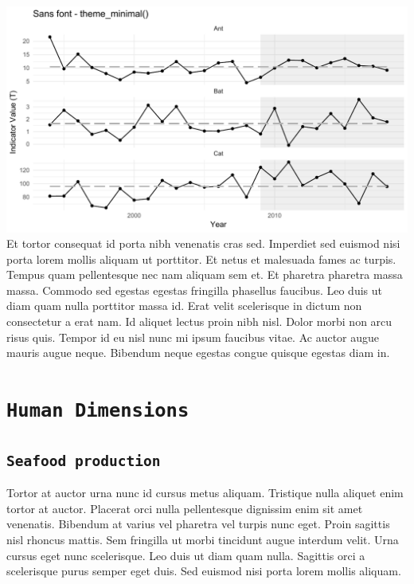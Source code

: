 \documentclass[11pt,]{article}
\begin{document}
\includegraphics{font_test_files/figure-latex/unnamed-chunk-1-1.pdf} Et
tortor consequat id porta nibh venenatis cras sed. Imperdiet sed euismod
nisi porta lorem mollis aliquam ut porttitor. Et netus et malesuada
fames ac turpis. Tempus quam pellentesque nec nam aliquam sem et. Et
pharetra pharetra massa massa. Commodo sed egestas egestas fringilla
phasellus faucibus. Leo duis ut diam quam nulla porttitor massa id. Erat
velit scelerisque in dictum non consectetur a erat nam. Id aliquet
lectus proin nibh nisl. Dolor morbi non arcu risus quis. Tempor id eu
nisl nunc mi ipsum faucibus vitae. Ac auctor augue mauris augue neque.
Bibendum neque egestas congue quisque egestas diam in.

\section{\texorpdfstring{\texttt{Human\ Dimensions}}{Human Dimensions}}\label{human-dimensions}

\subsection{\texorpdfstring{\texttt{Seafood\ production}}{Seafood production}}\label{seafood-production}

Tortor at auctor urna nunc id cursus metus aliquam. Tristique nulla
aliquet enim tortor at auctor. Placerat orci nulla pellentesque
dignissim enim sit amet venenatis. Bibendum at varius vel pharetra vel
turpis nunc eget. Proin sagittis nisl rhoncus mattis. Sem fringilla ut
morbi tincidunt augue interdum velit. Urna cursus eget nunc scelerisque.
Leo duis ut diam quam nulla. Sagittis orci a scelerisque purus semper
eget duis. Sed euismod nisi porta lorem mollis aliquam.
\end{document}

